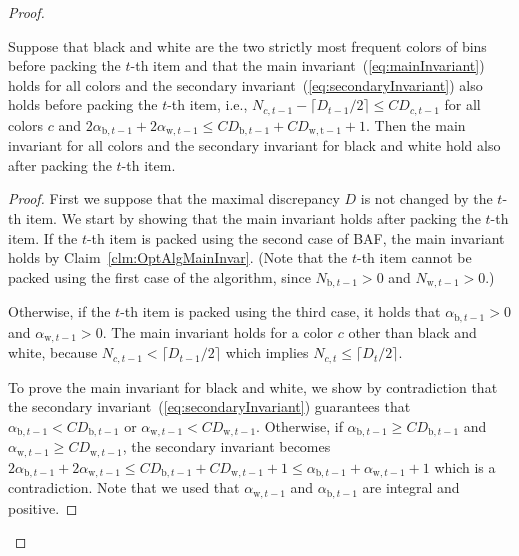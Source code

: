 \documentclass[11pt,a4paper]{article}
\def\vari#1{\mathit{#1}}
\begin{document}
\begin{proof}
\begin{claim} \label{clm:OptAlgInductionSecondary}
Suppose that black and white are the two strictly most frequent colors of bins
before packing the $t$-th item and that the main invariant~(\ref{eq:mainInvariant}) holds for all
colors and the secondary invariant~(\ref{eq:secondaryInvariant}) also holds before packing the $t$-th item, i.e., 
$N_{c,t-1} - \lceil D_{t-1}/2\rceil \leq \vari{CD}_{c,t-1}$ for all colors $c$ and
$2\alpha_{\mathrm{b},t-1} + 2\alpha_{\mathrm{w},t-1} \leq \vari{CD}_{\mathrm{b},t-1} + \vari{CD}_{\mathrm{w,t-1}} + 1$.
Then the main invariant for all colors and the secondary invariant for black and white hold also after packing the $t$-th item.
\end{claim}

\begin{proof}
First we suppose that the maximal discrepancy $D$ is not changed by the $t$-th item.
We start by showing that the main invariant holds after packing the $t$-th item.
If the $t$-th item is packed using the second case of BAF,
the main invariant holds by Claim~\ref{clm:OptAlgMainInvar}.
(Note that the $t$-th item cannot be packed using the first case of the algorithm,
since $N_{\mathrm{b},t-1} > 0$ and $N_{\mathrm{w},t-1} > 0$.)

Otherwise, if the $t$-th item is packed using the third case,
it holds that $\alpha_{\mathrm{b},t-1} > 0$ and $\alpha_{\mathrm{w},t-1} > 0$.
The main invariant holds for a color $c$ other than black and white,
because $N_{c,t-1} < \lceil D_{t-1}/2\rceil$ which implies $N_{c,t}\leq \lceil D_{t}/2\rceil$.

To prove the main invariant for black and white,
we show by contradiction that the secondary invariant~(\ref{eq:secondaryInvariant})
guarantees that
$\alpha_{\mathrm{b},t-1} < \vari{CD}_{\mathrm{b},t-1}$ or $\alpha_{\mathrm{w},t-1} < \vari{CD}_{\mathrm{w},t-1}$.
Otherwise, if $\alpha_{\mathrm{b},t-1} \geq \vari{CD}_{\mathrm{b},t-1}$ and
$\alpha_{\mathrm{w},t-1} \geq \vari{CD}_{\mathrm{w},t-1}$, the secondary invariant becomes
$2\alpha_{\mathrm{b},t-1} + 2\alpha_{\mathrm{w},t-1} \leq \vari{CD}_{\mathrm{b},t-1} + \vari{CD}_{\mathrm{w},t-1} + 1
\leq \alpha_{\mathrm{b},t-1} + \alpha_{\mathrm{w},t-1} + 1$ which is a contradiction.
Note that we used that $\alpha_{\mathrm{w},t-1}$ and $\alpha_{\mathrm{b},t-1}$
are integral and positive.


\end{proof}
\end{proof}
\end{document}
